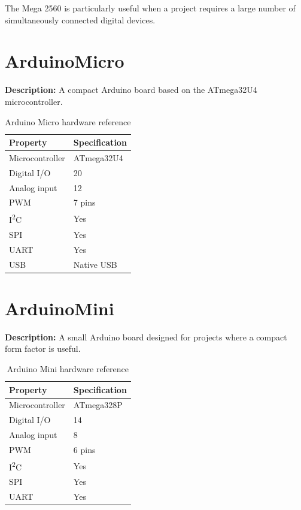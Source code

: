 The Mega 2560 is particularly useful when a project requires a large number
of simultaneously connected digital devices.

\newpage
\section{ArduinoMicro}

\textbf{Description:} A compact Arduino board based on the ATmega32U4
microcontroller.

\begin{table}[H]
\centering
\caption{Arduino Micro hardware reference}
\label{tab:board-micro}
\begin{tabular}{ll}
\toprule
\textbf{Property} & \textbf{Specification} \\
\midrule
Microcontroller & ATmega32U4 \\
Digital I/O & 20 \\
Analog input & 12 \\
PWM & 7 pins \\
I\textsuperscript{2}C & Yes \\
SPI & Yes \\
UART & Yes \\
USB & Native USB \\
\bottomrule
\end{tabular}
\end{table}

\section{ArduinoMini}

\textbf{Description:} A small Arduino board designed for projects where a
compact form factor is useful.

\begin{table}[H]
\centering
\caption{Arduino Mini hardware reference}
\label{tab:board-mini}
\begin{tabular}{ll}
\toprule
\textbf{Property} & \textbf{Specification} \\
\midrule
Microcontroller & ATmega328P \\
Digital I/O & 14 \\
Analog input & 8 \\
PWM & 6 pins \\
I\textsuperscript{2}C & Yes \\
SPI & Yes \\
UART & Yes \\
\bottomrule
\end{tabular}
\end{table}

